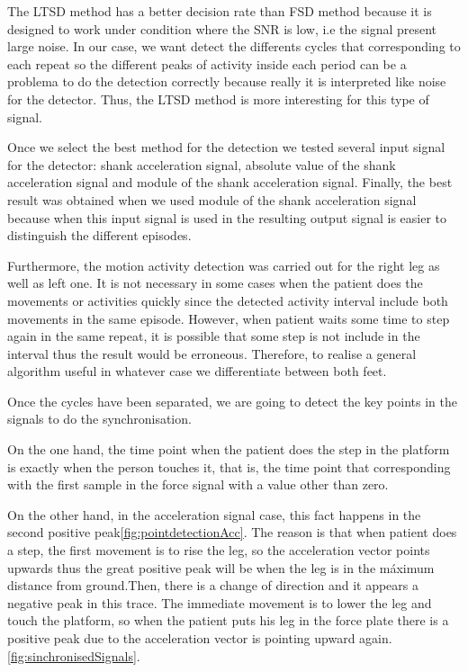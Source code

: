 The LTSD method has a better decision rate than FSD method because it is designed to work under condition where the SNR is low, i.e the signal present large noise\cite{A.Olivares2013}. In our case, we want detect the differents cycles that corresponding to each repeat so the different peaks of activity inside each period can be a problema to do the detection correctly because really it is interpreted like noise for the detector. Thus, the LTSD method is more interesting for this type of signal.

Once we select the best method for the detection we tested several input signal for the detector: shank acceleration signal, absolute value of the shank acceleration signal and module of the shank acceleration signal. Finally, the best result was obtained when we used module of the shank acceleration signal because when this input signal is used in the resulting output signal is easier to distinguish the different episodes.

Furthermore, the motion activity detection was carried out for the right leg as well as left one. It is not necessary in some cases when the patient does the movements or activities quickly since the detected activity interval  include both movements in the same episode. However, when patient waits some time to step again in the same repeat, it is possible that some step is not  include in the interval thus the result would be erroneous. Therefore, to realise a general algorithm useful in whatever case we differentiate between both feet.

Once the cycles have been separated, we are going to detect the key points in the signals to do the synchronisation. 

On the one hand, the time point when the patient does the step in the platform is exactly when the person touches it, that is, the time point that corresponding with the first sample in the force signal with a value other than zero.

On the other hand, in the acceleration signal case, this fact happens in the second positive peak\ref{fig:pointdetectionAcc}. The reason is that when patient does a step, the first movement is to rise the leg, so the acceleration vector points upwards thus the great positive peak will be when the leg is in the máximum distance from ground.Then, there is a change of direction and it appears a negative peak in this trace. The immediate movement is to lower the leg and touch the platform, so when the patient puts his leg in the force plate there is a positive peak due to the acceleration vector is pointing upward again.\ref{fig:sinchronisedSignals}.

